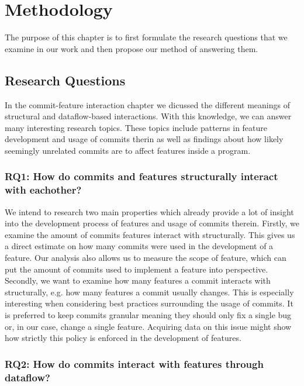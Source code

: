 \section*{Methodology}\label{ch:methodology}

The purpose of this chapter is to first formulate the research questions that we examine in our work
and then propose our method of answering them.

\subsection*{Research Questions}\label{sec:research_questions}

In the commit-feature interaction chapter we dicussed the different meanings of structural and dataflow-based interactions.
With this knowledge, we can answer many interesting research topics. 
These topics include patterns in feature development and usage of commits therin as well as findings about how likely seemingly unrelated commits are to affect features inside a program.

\subsubsection*{\textbf{RQ1: How do commits and features structurally interact with eachother?}}

We intend to research two main properties which already provide a lot of insight into the development process of features and usage of commits therein.
Firstly, we examine the amount of commits features interact with structurally.
This gives us a direct estimate on how many commits were used in the development of a feature.
Our analysis also allows us to measure the scope of feature, which can put the amount of commits used to implement a feature into perspective.
Secondly, we want to examine how many features a commit interacts with structurally, e.g. how many features a commit usually changes. 
This is especially interesting when considering best practices surrounding the usage of commits.
It is preferred to keep commits granular\cite{GitBestPractices2023} meaning they should only fix a single bug or, in our case, change a single feature.
Acquiring data on this issue might show how strictly this policy is enforced in the development of features. 

\subsubsection*{\textbf{RQ2: How do commits interact with features through dataflow?}}

